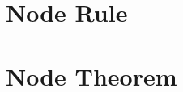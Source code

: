 \documentclass[master.tex]{subfiles}
\begin{document}


\section{Node Rule}
\section{Node Theorem}







\end{document}
